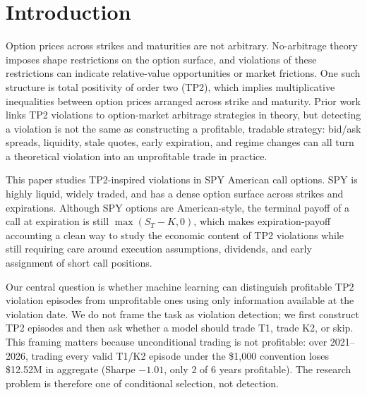 \documentclass[sigconf,review,anonymous]{acmart}
\begin{document}


\maketitle

\section{Introduction}
\label{sec:intro}

Option prices across strikes and maturities are not arbitrary. No-arbitrage theory imposes shape restrictions on the option surface, and violations of these restrictions can indicate relative-value opportunities or market frictions. One such structure is total positivity of order two (TP2), which implies multiplicative inequalities between option prices arranged across strike and maturity. Prior work links TP2 violations to option-market arbitrage strategies in theory, but detecting a violation is not the same as constructing a profitable, tradable strategy: bid/ask spreads, liquidity, stale quotes, early expiration, and regime changes can all turn a theoretical violation into an unprofitable trade in practice.

This paper studies TP2-inspired violations in SPY American call options. SPY is highly liquid, widely traded, and has a dense option surface across strikes and expirations. Although SPY options are American-style, the terminal payoff of a call at expiration is still $\max(S_T-K,0)$, which makes expiration-payoff accounting a clean way to study the economic content of TP2 violations while still requiring care around execution assumptions, dividends, and early assignment of short call positions.

Our central question is whether machine learning can distinguish profitable TP2 violation episodes from unprofitable ones using only information available at the violation date. We do not frame the task as violation detection; we first construct TP2 episodes and then ask whether a model should trade T1, trade K2, or skip. This framing matters because unconditional trading is not profitable: over 2021--2026, trading every valid T1/K2 episode under the \$1,000 convention loses \$12.52M in aggregate (Sharpe $-1.01$, only 2 of 6 years profitable). The research problem is therefore one of conditional selection, not detection.
\end{document}
